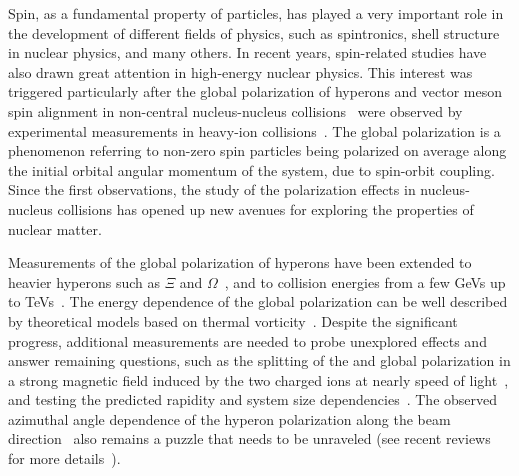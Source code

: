 \documentclass[preprint,5p,times,twocolumn]{elsarticle}
\begin{document}
Spin, as a fundamental property of particles, has played a very important role in the development of different fields of physics, such as spintronics, shell structure in nuclear physics, and many others. 
In recent years, spin-related studies have also drawn great attention in high-energy nuclear physics. This interest was triggered particularly after the global polarization of hyperons and vector meson spin alignment in non-central nucleus-nucleus collisions~\cite{1,Voloshin:2004ha,Liang:2004xn,2,Gao:2007bc} were observed by experimental measurements in heavy-ion collisions~\cite{STAR:2017ckg,STAR:2022fan}.
The global polarization is a phenomenon referring to non-zero spin particles being polarized on average along the initial orbital angular momentum of the system, due to spin-orbit coupling.
Since the first observations, the study of the polarization effects in nucleus-nucleus collisions has opened up new avenues for exploring the properties of nuclear matter.


Measurements of the global polarization of \lam hyperons have been extended to heavier hyperons such as $\Xi$ and $\Omega$~\cite{STAR:2020xbm}, and to collision energies from a few GeVs up to TeVs~\cite{STAR:2007ccu,STAR:2018gyt,ALICE:2019onw,STAR:2021beb,STAR:2023nvo,HADES:2022enx}.
The energy dependence of the global polarization can be well described by theoretical models based on thermal vorticity~\cite{Deng:2016gyh,Wei:2018zfb,Guo:2021udq,Bozek:2010bi,Ivanov:2018eej,Wu:2019eyi,Ivanov:2019ern,Ivanov:2020wak,Liang:2019pst,Jiang:2016woz}.  
%
Despite the significant progress, additional measurements are needed to probe unexplored effects and answer remaining questions, such as the splitting of the \lam and \alam global polarization in a strong magnetic field induced by the two charged ions at nearly speed of light~\cite{McLerran:2013hla,Becattini:2016gvu,Muller:2018ibh}, and testing the predicted rapidity and system size dependencies~\cite{Wu:2019eyi,Xie:2019jun,Liang:2019pst,Shi:2017wpk,Alzhrani:2022dpi}. 
The observed azimuthal angle dependence of the hyperon polarization along the beam direction~\cite{STAR:2019erd,ALICE:2021pzu,STAR:2023eck} also remains a puzzle that needs to be unraveled (see recent reviews for more details~\cite{Becattini:2020ngo,Becattini:2024uha,Niida:2024ntm,Chen:2024aom}).
\end{document}
